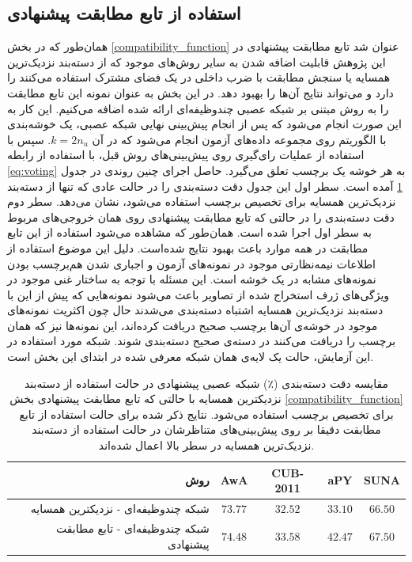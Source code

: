 \subsection{استفاده از تابع مطابقت پیشنهادی}\label{exp:nn_comp}
همان‌طور که در بخش \ref{compatibility_function} عنوان شد تابع مطابقت پیشنهادی  در این پژوهش قابلیت اضافه شدن به سایر روش‌های موجود که از دسته‌بند نزدیک‌ترین همسایه یا سنجش مطابقت با ضرب داخلی در یک فضای مشترک استفاده می‌کنند را دارد و می‌تواند نتایج آن‌ها را بهبود دهد. در این بخش به عنوان نمونه این تابع مطابقت را به روش مبتنی بر شبکه عصبی چندوظیفه‌ای ارائه شده اضافه می‌کنیم. این کار به این صورت انجام می‌شود که پس از انجام پیش‌بینی نهایی شبکه عصبی، یک خوشه‌بندی با الگوریتم  روی مجموعه داده‌های آزمون انجام می‌شود که در آن $k=2n_u$. سپس با استفاده از عملیات رای‌گیری روی پیش‌بینی‌های روش قبل، با استفاده از رابطه \eqref{eq:voting} به هر خوشه یک برچسب تعلق می‌گیرد. حاصل اجرای چنین روندی در جدول \ref{tab:nn_comp} آمده است. سطر اول این جدول دقت دسته‌بندی را در حالت عادی که تنها از دسته‌بند نزدیک‌ترین همسایه برای تخصیص برچسب استفاده می‌شود، نشان می‌دهد. سطر دوم دقت دسته‌بندی را در حالتی که تابع مطابقت پیشنهادی روی همان خروجی‌های مربوط به سطر اول اجرا شده است. همان‌طور که مشاهده می‌شود استفاده از این تابع مطابقت در همه موارد باعث بهبود نتایج شده‌است. دلیل این موضوع استفاده از اطلاعات نیمه‌نظارتی موجود در نمونه‌های آزمون و  اجباری شدن هم‌برچسب بودن نمونه‌های مشابه در یک خوشه است.  این مسئله با توجه به ساختار غنی موجود در ویژگی‌های ژرف استخراج شده از تصاویر باعث می‌شود نمونه‌هایی که پیش از این با دسته‌بند نزدیک‌ترین همسایه اشتباه دسته‌بندی می‌شدند حال چون اکثریت نمونه‌های موجود در خوشه‌ی آن‌ها برچسب صحیح دریافت کرده‌اند، این نمونه‌ها نیز که همان برچسب را دریافت می‌کنند در دسته‌ی صحیح دسته‌بندی شوند.
 شبکه مورد استفاده در این آزمایش، حالت یک لایه‌ی همان شبکه معرفی شده در ابتدای این بخش است.
\begin{table}[t]
\caption [دقت دسته‌بندی با شبکه عصبی به همراه تابع مطابقت پیشنهادی]{
مقایسه دقت دسته‌بندی (٪) شبکه عصبی پیشنهادی در حالت استفاده از دسته‌بند نزدیکترین همسایه با حالتی که تابع مطابقت پیشنهادی بخش  \ref{compatibility_function} برای تخصیص برچسب استفاده می‌شود.
نتایج ذکر شده برای حالت استفاده از تابع مطابقت دقیقا بر روی پیش‌بینی‌های متناظرشان در حالت استفاده از دسته‌بند نزدیک‌ترین همسایه در سطر بالا اعمال شده‌اند.
}
\label{tab:nn_comp}
\begin{center}
\begin{tabular}{|r|c|c|c|c|}
\hline
روش  & AwA & CUB-2011 & aPY & SUNA \\
\hline
شبکه چندوظیفه‌ای - نزدیکترین همسایه
                      & {${73.77}$}  & {${32.52}$} & ${33.10}$ & { ${66.50}$} \\ \hline
شبکه  چندوظیفه‌ای - تابع مطابقت پیشنهادی
                      & $74.48$  & \textbf{${33.58}$} & \textbf{${42.47}$} & \textbf{ ${67.50}$} \\ \hline
\end{tabular}

\end{center}
\end{table}

